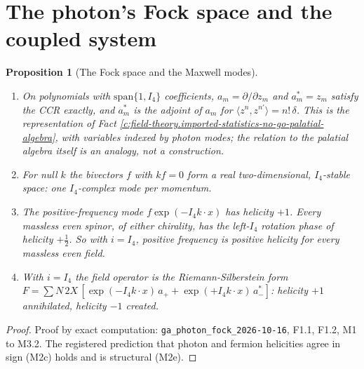 \documentclass[11pt]{article}
\newtheorem{proposition}[theorem]{Proposition}
\theoremstyle{definition}
\theoremstyle{plain}
\providecommand{\ip}{}\renewcommand{\ip}[2]{\langle #1, #2\rangle}
\begin{document}
\section{The photon's Fock space and the coupled system}

\begin{proposition}[The Fock space and the Maxwell modes]\label{c:field-theory.fock-space-maxwell-modes}
\begin{enumerate}
\item On polynomials with $\mathrm{span}\{1, I_4\}$ coefficients, $a_m = \partial/\partial z_m$ and $a_m^* = z_m$ satisfy the CCR exactly, and $a_m^*$ is the adjoint of $a_m$ for $\ip{z^n}{z^{n'}} = n!\,\delta$. This is the representation of Fact \ref{c:field-theory.imported-statistics-no-go-palatial-algebra}, with variables indexed by photon modes; the relation to the palatial algebra itself is an analogy, not a construction.
\item For null $k$ the bivectors $f$ with $kf = 0$ form a real two-dimensional, $I_4$-stable space: one $I_4$-complex mode per momentum.
\item The positive-frequency mode $f\exp(-I_4k\cdot x)$ has helicity $+1$. Every massless even spinor, of either chirality, has the left-$I_4$ rotation phase of helicity $+\tfrac12$. So with $i = I_4$, positive frequency is positive helicity for every massless even field.
\item With $i = I_4$ the field operator is the Riemann-Silberstein form $F = \sum N\,2X\,[\exp(-I_4k\cdot x)\,a_+ + \exp(+I_4k\cdot x)\,a_-^*]$: helicity $+1$ annihilated, helicity $-1$ created.
\end{enumerate}
\end{proposition}
\begin{proof}
Proof by exact computation: \texttt{ga\_photon\_fock\_2026-10-16}, F1.1, F1.2, M1 to M3.2. The registered prediction that photon and fermion helicities agree in sign (M2c) holds and is structural (M2e).

\end{proof}
\end{document}
